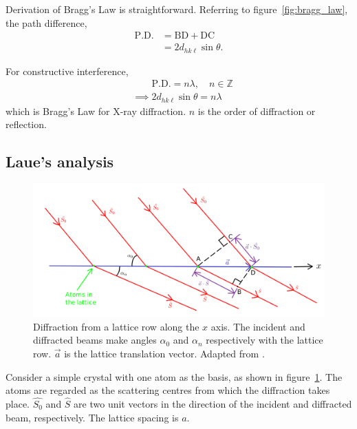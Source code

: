 	Derivation of Bragg's Law is straightforward. Referring to figure~\ref{fig:bragg_law}, the path difference,%
%	
	\begin{align}
	\mathrm{P.D.} &= \mathrm{BD} + \mathrm{DC} \nonumber\\
				&= 2 d_{hk\ell} \sin \theta.
	\end{align}
	
	For constructive interference,%
%	
	\begin{align}
	&\phantom{\implies} \mathrm{P.D.} = n \lambda,\quad n \in \mathbb{Z} \nonumber\\
	&\implies \boxed{2 d_{hk\ell} \sin \theta = n \lambda}
	\end{align}
%	
	which is Bragg's Law for X-ray diffraction. $n$ is the order of diffraction or reflection.
	
	
\subsection{Laue's analysis}

	\begin{figure}
	\centering
	\includegraphics[scale=0.17]{laue_analysis.png}
	\caption{\label{fig:laue_analysis}Diffraction from a lattice row along the $x$ axis. The incident and diffracted beams make angles $\alpha_0$ and $\alpha_n$ respectively with the lattice row. $\vec{a}$ is the lattice translation vector. Adapted from \cite{Hammond2015}.}
	\end{figure}
	
	Consider a simple crystal with one atom as the basis, as shown in figure~\ref{fig:laue_analysis}. The atoms are regarded as the scattering centres from which the diffraction takes place. $\hat{S_0}$ and $\hat{S}$ are two unit vectors in the direction of the incident and diffracted beam, respectively. The lattice spacing is $a$.
	
